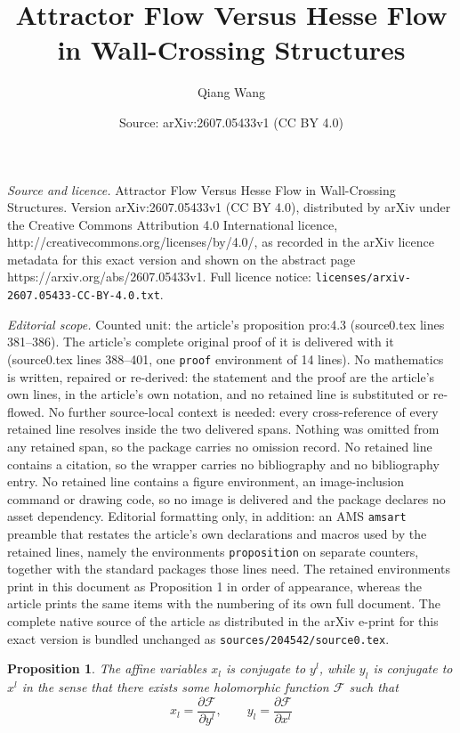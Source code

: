\documentclass[10pt,a4paper]{amsart}
\title{Attractor Flow Versus Hesse Flow in Wall-Crossing Structures}
\author{Qiang Wang}
\date{Source: arXiv:2607.05433v1 (CC BY 4.0)}
\newtheorem{proposition}{Proposition}
\begin{document}
\maketitle

\noindent\emph{Source and licence.} Attractor Flow Versus Hesse Flow in Wall-Crossing Structures. Version arXiv:2607.05433v1 (CC BY 4.0), distributed by arXiv under the Creative Commons Attribution 4.0 International licence, http://creativecommons.org/licenses/by/4.0/, as recorded in the arXiv licence metadata for this exact version and shown on the abstract page https://arxiv.org/abs/2607.05433v1. Full licence notice: \texttt{licenses/arxiv-2607.05433-CC-BY-4.0.txt}.\par\smallskip

\noindent\textit{Editorial scope.} Counted unit: the article's proposition pro:4.3 (source0.tex lines 381--386). The article's complete original proof of it is delivered with it (source0.tex lines 388--401, one \texttt{proof} environment of 14 lines). No mathematics is written, repaired or re-derived: the statement and the proof are the article's own lines, in the article's own notation, and no retained line is substituted or re-flowed.  No further source-local context is needed: every cross-reference of every retained line resolves inside the two delivered spans.  Nothing was omitted from any retained span, so the package carries no omission record.  No retained line contains a citation, so the wrapper carries no bibliography and no bibliography entry.  No retained line contains a figure environment, an image-inclusion command or drawing code, so no image is delivered and the package declares no asset dependency.  Editorial formatting only, in addition: an AMS \texttt{amsart} preamble that restates the article's own declarations and macros used by the retained lines, namely the environments \texttt{proposition} on separate counters, together with the standard packages those lines need.  The retained environments print in this document as Proposition 1 in order of appearance, whereas the article prints the same items with the numbering of its own full document.  The complete native source of the article as distributed in the arXiv e-print for this exact version is bundled unchanged as \texttt{sources/204542/source0.tex}.
\begin{proposition}\label{pro:4.3}
The affine variables $x_{l}$ is conjugate to $y^{l}$, while $y_{l}$ is conjugate to $x^{l}$ in the sense that there exists some holomorphic function $\mathscr{F}$ such that
\begin{equation}\label{eq:18}
          x_{l}=\frac{\partial\mathscr{F}}{\partial y^{l}},\qquad y_{l}=\frac{\partial\mathscr{F}}{\partial x^{l}}
\end{equation}
\end{proposition}
\end{document}

